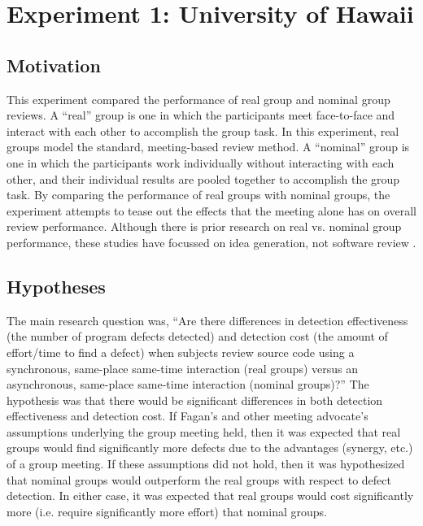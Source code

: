 

\section{Experiment 1: University of Hawaii}

\subsection{Motivation}

This experiment compared the performance of real group and nominal group
reviews.  A ``real'' group is one in which the participants meet
face-to-face and interact with each other to accomplish the group task.
In this experiment, real groups model the standard, meeting-based review method.  A
``nominal'' group is one in which the participants work individually
without interacting with each other, and their individual results are
pooled together to accomplish the group task. By comparing the 
performance of real groups with nominal groups, the experiment attempts
to tease out the effects that the meeting alone has on 
overall review performance.   Although there is prior
research on real vs. nominal group performance, these studies have focussed
on idea generation, not software review \cite{Diehl87,Mullen91}.

\subsection{Hypotheses}

The main research question was, ``Are there differences in detection
effectiveness (the number of program defects detected) and detection cost
(the amount of effort/time to find a defect) when subjects review source
code using a synchronous, same-place same-time interaction (real groups)
versus an asynchronous, same-place same-time interaction (nominal
groups)?''  The hypothesis was that there would be significant
differences in both detection effectiveness and detection cost. If Fagan's
and other meeting advocate's assumptions underlying the group meeting held,
then it was expected that real groups would find significantly more defects
due to the advantages (synergy, etc.) of a group meeting. If these
assumptions did not hold, then it was hypothesized that nominal groups
would outperform the real groups with respect to defect detection.  In
either case, it was expected that real groups would cost significantly 
more (i.e. require significantly more effort) that nominal groups.


